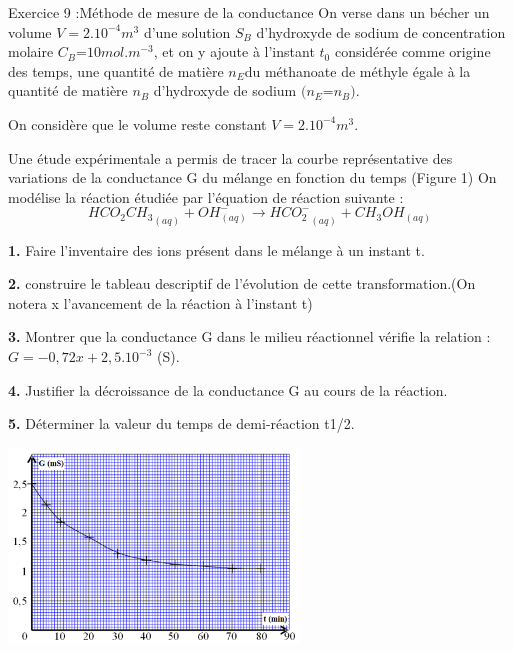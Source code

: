 \documentclass[12pt, french]{article}
\begin{document}
\begin{Box2}{Exercice 9 :Méthode de mesure de la conductance }
	On verse dans un bécher un volume $V = 2.10^{-4} m^3$ d’une solution $S_B$ d’hydroxyde de
	sodium de concentration molaire $C_B$=$10mol.m^{-3}$, et on y ajoute à l’instant $t_0$ considérée comme origine des temps, une quantité de matière   $n_E$du méthanoate de méthyle égale à la quantité de matière $n_B$ d’hydroxyde de sodium $(n_E$=$n_B)$.


	On considère que le volume reste constant $V = 2.10^{-4} m^3$.
	
Une étude expérimentale a permis de tracer la courbe représentative des variations de
la conductance G du mélange en fonction du temps (Figure 1)
On modélise la réaction étudiée par l’équation de réaction suivante :
$${HCO_2CH_3}_{(aq)} + OH^-_{(aq)} \rightarrow {HCO_2^-}_{(aq)} + CH_3OH_{(aq)} $$

\textbf{1. }Faire l’inventaire des ions
présent dans le mélange à un
instant t.

\textbf{2. } construire le tableau descriptif
de l’évolution de
cette transformation.(On notera x l’avancement de la
réaction à l’instant t)

\textbf{3. } Montrer que la conductance G
dans le milieu réactionnel
vérifie la relation : $G = - 0,72 x + 2,5.10^{-3}$ (S).

\textbf{4.} Justifier la décroissance de la conductance G au cours de la réaction.

\textbf{5. }
Déterminer la valeur du temps de demi-réaction t1/2.

  \begin{center}
	\includegraphics[width=0.58\textwidth]{./img/ex09.png}
  \end{center}



\end{Box2}
\end{document}
